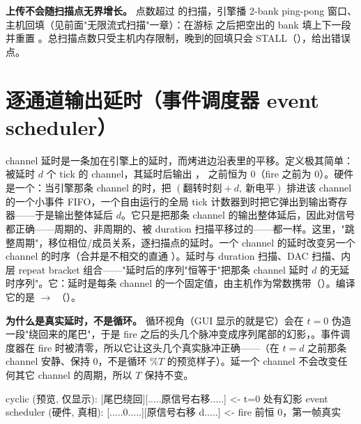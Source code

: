 \documentclass[11pt,oneside,openany]{book}
\begin{document}
\textbf{上传不会随扫描点无界增长。} 点数超过  的扫描，引擎播 2-bank ping-pong 窗口、主机回填（见前面"无限流式扫描"一章）：在游标  之后把空出的 bank 填上下一段并重置 。总扫描点数只受主机内存限制，晚到的回填只会 STALL（），给出错误点。

\section{逐通道输出延时（事件调度器 event scheduler）}
channel 延时是一条加在引擎上的延时，而烤进边沿表里的平移。定义极其简单：被延时 $d$ 个 tick 的 channel，其延时后输出 ， 之前恒为 0（fire 之前为 0）。硬件是一个：当引擎那条 channel 的时，把 $(\text{翻转时刻}+d,\ \text{新电平})$ 排进该 channel 的一个小事件 FIFO，一个自由运行的全局 tick 计数器到时把它弹出到输出寄存器——于是输出整体延后 $d$。它只是把那条 channel 的输出整体延后，因此对信号都正确——周期的、非周期的、被 duration 扫描平移过的——都一样。这里，"跳整周期"，移位相位/成员关系，逐扫描点的延时。一个 channel 的延时改变另一个 channel 的时序（合并是不相交的直通 ）。延时与 duration 扫描、DAC 扫描、内层 repeat bracket 组合——"延时后的序列"恒等于"把那条 channel 延时 $d$ 的无延时序列"。它：延时是每条 channel 的一个固定值，由主机作为常数携带（）。编译它的是  $\rightarrow$ （）。

\textbf{为什么是真实延时，不是循环。} 循环视角（GUI 显示的就是它）会在 $t=0$ 伪造一段"绕回来的尾巴"，于是 fire 之后的头几个脉冲变成序列尾部的幻影，。事件调度器在 fire 时被清零，所以它让这头几个真实脉冲正确——（在 $t=d$ 之前那条 channel 安静、保持 0，不是循环 \%$T$ 的预览样子）。延一个 channel 不会改变任何其它 channel 的周期，所以 $T$ 保持不变。

\begin{codeblock}
cyclic (预览, 仅显示):     [尾巴绕回][.....原信号右移.....]   <- t=0 处有幻影
event scheduler (硬件, 真相): [.....0.....][原信号右移 d.....]   <- fire 前恒 0，第一帧真实
\end{codeblock}
\end{document}

